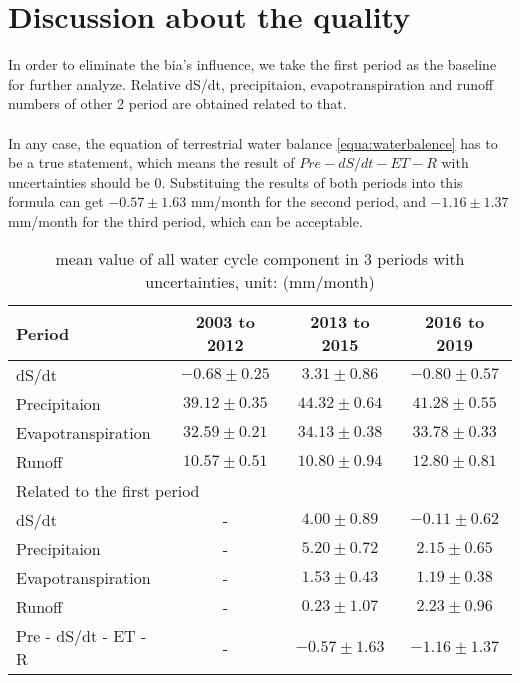 \section{Discussion about the quality}
In order to eliminate the bia's influence, we take the first period as the baseline for further analyze. Relative dS/dt, precipitaion, evapotranspiration and runoff numbers of other 2 period are obtained related to that. \\\\
In any case, the equation of terrestrial water balance \autoref{equa:waterbalence} has to be a true statement, which means the result of $Pre-dS/dt-ET-R$ with uncertainties should be 0. Substituing the results of both periods into this formula can get $-0.57 \pm 1.63$ mm/month for the second period, and $-1.16 \pm 1.37$ mm/month for the third period, which can be acceptable. 
\begin{table}[htbp]\centering
	\begin{tabular}{|l|c|c|c|}
		\hline
		Period &  2003 to 2012 & 2013 to 2015 & 2016 to 2019  \\ \hline
		dS/dt            & $-0.68 \pm 0.25$     & $3.31 \pm 0.86$        & $-0.80 \pm 0.57$        \\ \hline
		Precipitaion               & $39.12 \pm 0.35$      & $44.32 \pm 0.64$       &$41.28 \pm 0.55$        \\ \hline
		Evapotranspiration           & $32.59 \pm 0.21$       & $34.13 \pm 0.38$       & $33.78 \pm 0.33$        \\ \hline
		Runoff                     & $10.57  \pm 0.51$      & $10.80 \pm 0.94 $     & $12.80 \pm 0.81 $      \\ \hline
		\multicolumn{4}{|l|}{Related to the first period}                                         \\ \hline
		dS/dt           &        -     & $4.00 \pm 0.89$        & $-0.11 \pm 0.62$        \\ \hline
		Precipitaion               &       -      & $5.20 \pm 0.72$        & $2.15 \pm 0.65$         \\ \hline
		Evapotranspiration           &    -         & $1.53 \pm 0.43$        & $1.19 \pm 0.38 $        \\ \hline
		Runoff                     &       -      & $0.23 \pm 1.07 $       & $2.23 \pm 0.96   $      \\ \hline
		Pre - dS/dt - ET - R &       -      & $-0.57 \pm 1.63$       & $-1.16 \pm 1.37 $    \\ \hline 
	\end{tabular}
	\caption{mean value of all water cycle component in 3 periods with uncertainties, unit: (mm/month)}
\end{table}